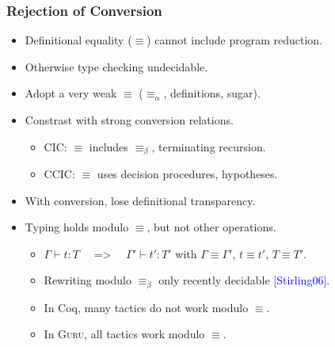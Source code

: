 \documentclass[11pt]{beamer}
\begin{document}
\begin{frame}
\frametitle{Rejection of Conversion}
\begin{itemize}
\item Definitional equality ($\equiv$) cannot include program reduction.

\item Otherwise type checking undecidable.

\item Adopt a very weak $\equiv$ ($\equiv_\alpha$, definitions, sugar).

\item Constrast with strong conversion relations.
\begin{itemize}
\item CIC: $\equiv$ includes $\equiv_\beta$, terminating recursion.

\item CCIC: $\equiv$ uses decision procedures, hypotheses.

\end{itemize}

\item With conversion, lose definitional transparency.
\item Typing holds modulo $\equiv$, but not other operations.
\begin{itemize}
\item $\Gamma \vdash t : T$ \ \ => \ \ $\Gamma' \vdash t' : T'$ with $\Gamma \equiv \Gamma'$, $t \equiv t'$, $T \equiv T'$.
\item Rewriting modulo $\equiv_\beta$ only recently decidable \textcolor{blue}{[Stirling06]}.
\item In Coq, many tactics do not work modulo $\equiv$.
\item In \textsc{Guru}, all tactics work modulo $\equiv$.
\end{itemize}

\end{itemize}
\end{frame}
\end{document}
